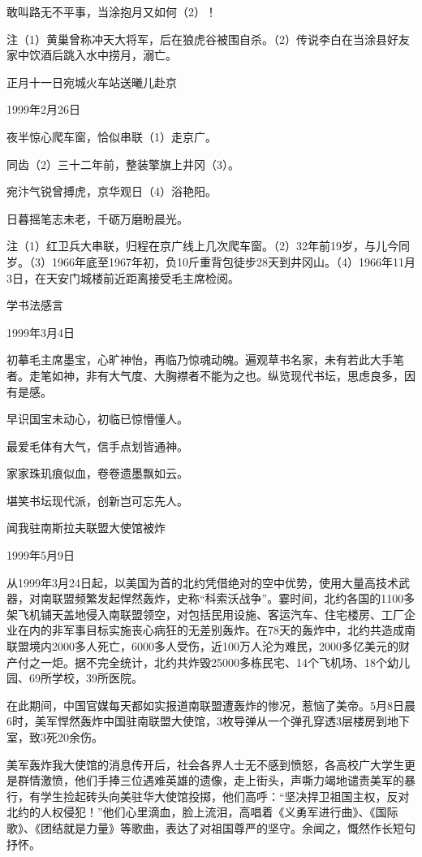 \documentclass[../../dazhuan.tex]{subfiles}
\begin{document}
敢叫路无不平事，当涂抱月又如何（2）！

注（1）黄巢曾称冲天大将军，后在狼虎谷被围自杀。（2）传说李白在当涂县好友家中饮酒后跳入水中捞月，溺亡。



正月十一日宛城火车站送曦儿赴京

1999年2月26日

夜半惊心爬车窗，恰似串联（1）走京广。

同齿（2）三十二年前，整装擎旗上井冈（3）。

宛汴气锐曾搏虎，京华观日（4）浴艳阳。

日暮摇笔志未老，千砺万磨盼晨光。

注（1）红卫兵大串联，归程在京广线上几次爬车窗。（2）32年前19岁，与儿今同岁。（3）1966年底至1967年初，负10斤重背包徒步28天到井冈山。（4）1966年11月3日，在天安门城楼前近距离接受毛主席检阅。



学书法感言

1999年3月4日

初摹毛主席墨宝，心旷神怡，再临乃惊魂动魄。遍观草书名家，未有若此大手笔者。走笔如神，非有大气度、大胸襟者不能为之也。纵览现代书坛，思虑良多，因有是感。

早识国宝未动心，初临已惊懵懂人。

最爱毛体有大气，信手点划皆通神。

家家珠玑痕似血，卷卷遗墨飘如云。

堪笑书坛现代派，创新岂可忘先人。



闻我驻南斯拉夫联盟大使馆被炸

1999年5月9日

从1999年3月24日起，以美国为首的北约凭借绝对的空中优势，使用大量高技术武器，对南联盟频繁发起悍然轰炸，史称“科索沃战争”。霎时间，北约各国的1100多架飞机铺天盖地侵入南联盟领空，对包括民用设施、客运汽车、住宅楼房、工厂企业在内的非军事目标实施丧心病狂的无差别轰炸。在78天的轰炸中，北约共造成南联盟境内2000多人死亡，6000多人受伤，近100万人沦为难民，2000多亿美元的财产付之一炬。据不完全统计，北约共炸毁25000多栋民宅、14个飞机场、18个幼儿园、69所学校，39所医院。

在此期间，中国官媒每天都如实报道南联盟遭轰炸的惨况，惹恼了美帝。5月8日晨6时，美军悍然轰炸中国驻南联盟大使馆，3枚导弹从一个弹孔穿透3层楼房到地下室，致3死20余伤。

美军轰炸我大使馆的消息传开后，社会各界人士无不感到愤怒，各高校广大学生更是群情激愤，他们手捧三位遇难英雄的遗像，走上街头，声嘶力竭地谴责美军的暴行，有学生捡起砖头向美驻华大使馆投掷，他们高呼：“坚决捍卫祖国主权，反对北约的人权侵犯！”他们心里滴血，脸上流泪，高唱着《义勇军进行曲》、《国际歌》、《团结就是力量》等歌曲，表达了对祖国尊严的坚守。余闻之，慨然作长短句抒怀。
\end{document}
